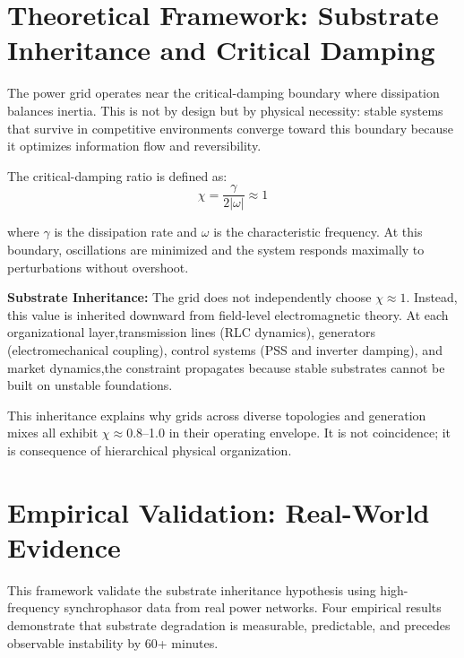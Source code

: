 \documentclass[11pt,letterpaper]{article}
\begin{document}

\section{Theoretical Framework: Substrate Inheritance and Critical Damping}

The power grid operates near the critical-damping boundary where dissipation balances inertia. This is not by design but by physical necessity: stable systems that survive in competitive environments converge toward this boundary because it optimizes information flow and reversibility.

The critical-damping ratio is defined as:
\begin{equation}
\chi = \frac{\gamma}{2|\omega|} \approx 1
\end{equation}

where $\gamma$ is the dissipation rate and $\omega$ is the characteristic frequency. At this boundary, oscillations are minimized and the system responds maximally to perturbations without overshoot.

\textbf{Substrate Inheritance:} The grid does not independently choose $\chi \approx 1$. Instead, this value is inherited downward from field-level electromagnetic theory. At each organizational layer,transmission lines (RLC dynamics), generators (electromechanical coupling), control systems (PSS and inverter damping), and market dynamics,the constraint propagates because stable substrates cannot be built on unstable foundations.



This inheritance explains why grids across diverse topologies and generation mixes all exhibit $\chi \approx 0.8$--1.0 in their operating envelope. It is not coincidence; it is consequence of hierarchical physical organization.


\section{Empirical Validation: Real-World Evidence}

This framework validate the substrate inheritance hypothesis using high-frequency synchrophasor data from real power networks. Four empirical results demonstrate that substrate degradation is measurable, predictable, and precedes observable instability by 60+ minutes.
\end{document}
